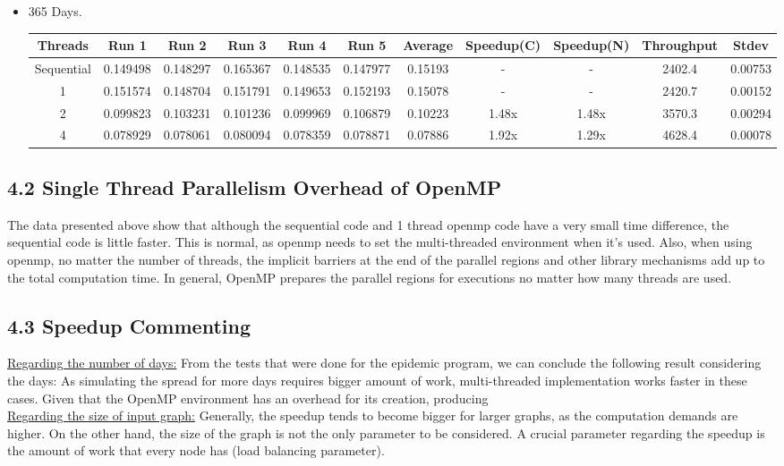 \documentclass{article}
\begin{document}
\begin{itemize}
    \item 365 Days.
    \begin{center}
    \begin{adjustbox}{width=\columnwidth,center}
    \begin{tabular}{||c | c c c c c | c | c c | c c ||} 
    \hline
    Threads & Run 1 & Run 2 & Run 3 & Run 4 & Run 5 & Average & Speedup(C) & Speedup(N) & Throughput & Stdev \\ [0.5ex] 
    \hline\hline
    Sequential & 0.149498 & 0.148297 & 0.165367 & 0.148535 & 0.147977 & 0.15193 & - & - & 2402.4  & 0.00753\\ 
    \hline
    1 & 0.151574 & 0.148704 & 0.151791 & 0.149653 & 0.152193 & 0.15078 & - & - & 2420.7 & 0.00152\\ 
    \hline
    2 & 0.099823 & 0.103231 & 0.101236 & 0.099969 & 0.106879 & 0.10223 & 1.48x & 1.48x &  3570.3 & 0.00294\\ 
    \hline
    4 & 0.078929 & 0.078061 & 0.080094 & 0.078359 & 0.078871 & 0.07886 & 1.92x & 1.29x & 4628.4 & 0.00078\\ 
    \hline
    \end{tabular}
    \end{adjustbox}
    \end{center}
\end{itemize}    

\subsection*{4.2 Single Thread Parallelism Overhead of OpenMP}
The data presented above show that although the sequential code and 1 thread openmp code have a very small time difference, the sequential code is little faster. This is normal, as openmp needs to set the multi-threaded environment when it's used. Also, when using openmp, no matter the number of threads, the implicit barriers at the end of the parallel regions and other library mechanisms add up to the total computation time. In general, OpenMP prepares the parallel regions for executions no matter how many threads are used.

\subsection*{4.3 Speedup Commenting}
\underline{Regarding the number of days:} From the tests that were done for the epidemic program, we can conclude the following result considering the days: As simulating the spread for more days requires bigger amount of work, multi-threaded implementation works faster in these cases. Given that the OpenMP environment has an overhead for its creation, producing \\
\underline{Regarding the size of input graph:} Generally, the speedup tends to become bigger for larger graphs, as the computation demands are higher. On the other hand, the size of the graph is not the only parameter to be considered. A crucial parameter regarding the speedup is the amount of work that every node has (load balancing parameter).
\end{document}
